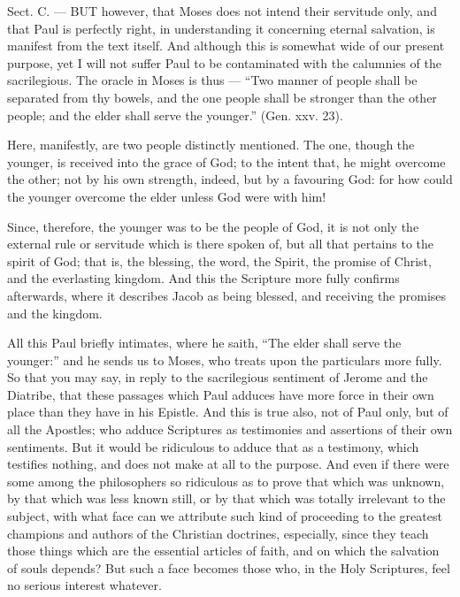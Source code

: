 
Sect. C. — BUT however, that Moses does not intend their servitude only, and that Paul is perfectly right, in understanding it concerning eternal salvation, is manifest from the text itself. And although this is somewhat wide of our present purpose, yet I will not suffer Paul to be contaminated with the calumnies of the sacrilegious. The oracle in Moses is thus — “Two manner of people shall be separated from thy bowels, and the one people shall be stronger than the other people; and the elder shall serve the younger.” (Gen. xxv. 23).

Here, manifestly, are two people distinctly mentioned. The one, though the younger, is received into the grace of God; to the intent that, he might overcome the other; not by his own strength, indeed, but by a favouring God: for how could the younger overcome the elder unless God were with him!

Since, therefore, the younger was to be the people of God, it is not only the external rule or servitude which is there spoken of, but all that pertains to the spirit of God; that is, the blessing, the word, the Spirit, the promise of Christ, and the everlasting kingdom. And this the Scripture more fully confirms afterwards, where it describes Jacob as being blessed, and receiving the promises and the kingdom.

All this Paul briefly intimates, where he saith, “The elder shall serve the younger:” and he sends us to Moses, who treats upon the particulars more fully. So that you may say, in reply to the sacrilegious sentiment of Jerome and the Diatribe, that these passages which Paul adduces have more force in their own place than they have in his Epistle. And this is true also, not of Paul only, but of all the Apostles; who adduce Scriptures as testimonies and assertions of their own sentiments. But it would be ridiculous to adduce that as a testimony, which testifies nothing, and does not make at all to the purpose. And even if there were some among the philosophers so ridiculous as to prove that which was unknown, by that which was less known still, or by that which was totally irrelevant to the subject, with what face can we attribute such kind of proceeding to the greatest champions and authors of the Christian doctrines, especially, since they teach those things which are the essential articles of faith, and on which the salvation of souls depends? But such a face becomes those who, in the Holy Scriptures, feel no serious interest whatever.

